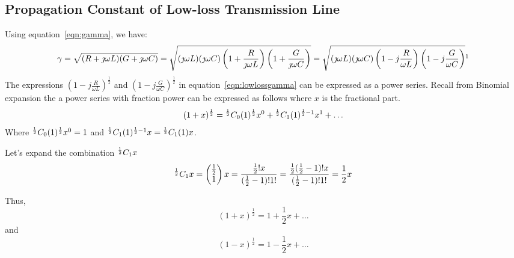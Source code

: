 \subsection{Propagation Constant of Low-loss Transmission Line}
Using equation~\eqref{eqn:gamma}, we have:
\begin{dmath}
\gamma = \sqrt{(R + \jmath\omega L)(G + \jmath\omega C)}
= \sqrt{{(\jmath\omega L)(\jmath\omega C)\left(1 + \frac{R}{\jmath\omega L}\right)\left(1 + \frac{G}{\jmath\omega C}\right)}}
= \sqrt{{(\jmath\omega L)(\jmath\omega C)\left(1 - j\frac{R}{\omega L}\right)\left(1 - j\frac{G}{\omega C}\right)}}\footnotemark
\label{eqn:lowlossgamma}
\end{dmath}
The expressions $\left(1 - j\frac{R}{\omega L}\right)^{\frac{1}{2}}$ and $\left(1 - j\frac{G}{\omega C}\right)^{\frac{1}{2}}$ in equation~\eqref{eqn:lowlossgamma} can be expressed as a power series. Recall from Binomial expansion the a power series with fraction power can be expressed as follows where $x$ is the fractional part.
\begin{dmath*}
(1 + x)^{\frac{1}{2}} = \Comb{\frac{1}{2}}{0}(1)^{\frac{1}{2}}x^0 + \Comb{\frac{1}{2}}{1}(1)^{{\frac{1}{2}} - 1}x^1 + \ldots
\end{dmath*}
Where ${}^{\frac{1}{2}}C_{0}(1)^{\frac{1}{2}}x^0 = 1$ and ${}^{\frac{1}{2}}C_{1}(1)^{\frac{1}{2} - 1}x = {}^{\frac{1}{2}}C_{1}(1)x$.

Let's expand the combination ${}^{\frac{1}{2}}C_{1} x$
\begin{dmath*}
\Comb{\frac{1}{2}}{1} x = \begin{pmatrix}\frac{1}{2}\\1 \end{pmatrix}x = \frac{\frac{1}{2}! x}{(\frac{1}{2} - 1)!1!} = \frac{\frac{1}{2}(\frac{1}{2} - 1)! x}{(\frac{1}{2} - 1)!1!} = \frac{1}{2}x
\end{dmath*}

Thus,
\[(1 + x)^{\frac{1}{2}} = 1 + \frac{1}{2}x + \ldots\]
and
\[(1 - x)^{\frac{1}{2}} = 1 - \frac{1}{2}x + \ldots\]

